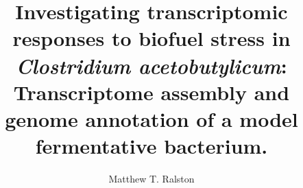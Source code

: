 % 
%

\title[Investigating transcriptomic responses to biofuel stress in Clostridium Aceotbutylicum : Transcriptome assembly and genome annotation of a model fermentative bacterium.]{Investigating transcriptomic responses to biofuel stress in \textit{Clostridium acetobutylicum}:\\ Transcriptome assembly and genome annotation of a model fermentative bacterium.}
\author{Matthew T. Ralston}
\majorfieldtrue{}
\subject{Master of Science in Bioinformatics and Computational Biology}

\maketitlepage %

\begin{approvalpage}
\end{approvalpage}

\begin{front} %







\maketocloflot



\end{front}

